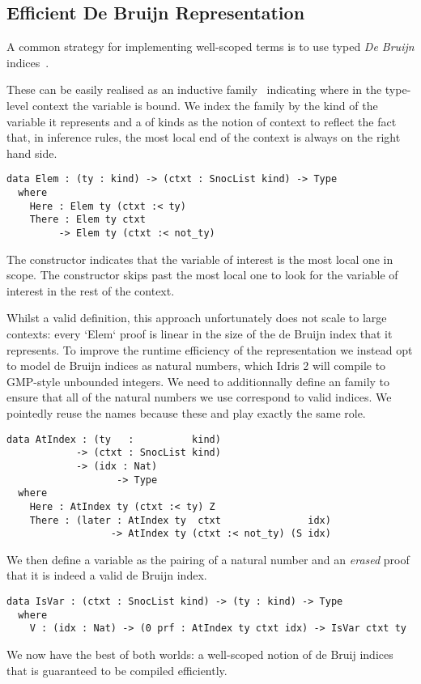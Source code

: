\subsection{Efficient De Bruijn Representation}
\label{sec:design:deBruijn}


A common strategy for implementing well-scoped terms is to use typed
\emph{De Bruijn} indices~\cite{MANUAL:journals/math/debruijn72}.

These can be easily realised as an inductive family~\cite{DBLP:journals/fac/Dybjer94}
indicating where in the type-level context the variable is bound.
%
We index the  family by the kind of the variable it represents and
a  of kinds as the notion of context to reflect the fact that,
in inference rules, the most local end of the context is always on the right hand side.

\begin{verbatim}
data Elem : (ty : kind) -> (ctxt : SnocList kind) -> Type
  where
    Here : Elem ty (ctxt :< ty)
    There : Elem ty ctxt
         -> Elem ty (ctxt :< not_ty)
\end{verbatim}

The  constructor indicates that the variable of interest is
the most local one in scope.
%
The  constructor skips past the most local one to look for
the variable of interest in the rest of the context.

Whilst a valid definition, this approach unfortunately does not scale to
large contexts: every `Elem` proof is linear in the size of the de Bruijn
index that it represents.
%
To improve the runtime efficiency of the representation we instead opt to
model de Bruijn indices as natural numbers, which Idris 2 will compile to
GMP-style unbounded integers.
%
We need to additionnally define an  family to ensure that
all of the natural numbers we use correspond to valid indices.%
%
We pointedly reuse the  names because these 
and  play exactly the same role.

\begin{verbatim}
data AtIndex : (ty   :          kind)
            -> (ctxt : SnocList kind)
            -> (idx : Nat)
                   -> Type
  where
    Here : AtIndex ty (ctxt :< ty) Z
    There : (later : AtIndex ty  ctxt               idx)
                  -> AtIndex ty (ctxt :< not_ty) (S idx)
\end{verbatim}

We then define a variable as the pairing of a natural number and an \emph{erased}
proof that it is indeed a valid de Bruijn index.

\begin{verbatim}
data IsVar : (ctxt : SnocList kind) -> (ty : kind) -> Type
  where
    V : (idx : Nat) -> (0 prf : AtIndex ty ctxt idx) -> IsVar ctxt ty
\end{verbatim}


We now have the best of both worlds: a well-scoped notion of de Bruij indices
that is guaranteed to be compiled efficiently.
